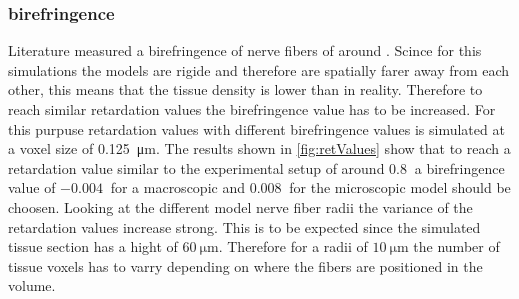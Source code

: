 \subsubsection{birefringence}
% 
Literature measured a birefringence of nerve fibers of around \dummy{}. 
Scince for this simulations the models are rigide and therefore are spatially farer away from each other, this means that the tissue density is lower than in reality.
Therefore to reach similar retardation values the birefringence value has to be increased.
For this purpuse retardation values with different birefringence values is simulated at a voxel size of \SI{0.125}{\micro\meter}.
The results shown in \cref{fig:retValues} show that to reach a retardation value similar to the experimental setup of around $\SI{0.8}{}$ a birefringence value of $\SI{-0.004}{}$ for a macroscopic and $\SI{0.008}{}$ for the microscopic model should be choosen.
Looking at the different model nerve fiber radii the variance of the retardation values increase strong.
This is to be expected since the simulated tissue section has a hight of $\SI{60}{\micro\meter}$.
Therefore for a radii of $\SI{10}{\micro\meter}$ the number of tissue voxels has to varry depending on where the fibers are positioned in the volume.
% 
% 
% 
% 
